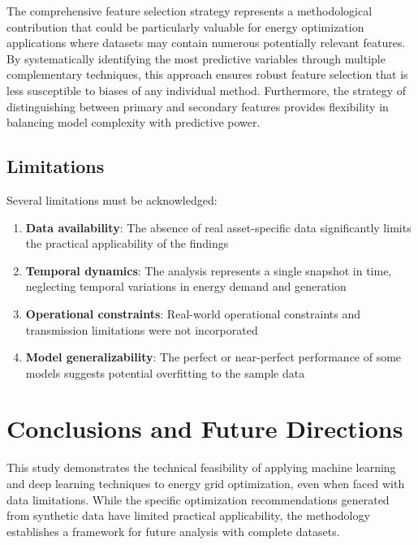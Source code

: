 \documentclass[12pt,a4paper]{article}
\begin{document}
The comprehensive feature selection strategy represents a methodological contribution that could be particularly valuable for energy optimization applications where datasets may contain numerous potentially relevant features. By systematically identifying the most predictive variables through multiple complementary techniques, this approach ensures robust feature selection that is less susceptible to biases of any individual method. Furthermore, the strategy of distinguishing between primary and secondary features provides flexibility in balancing model complexity with predictive power.

\subsection{Limitations}

Several limitations must be acknowledged:

\begin{enumerate}
    \item \textbf{Data availability}: The absence of real asset-specific data significantly limits the practical applicability of the findings
    \item \textbf{Temporal dynamics}: The analysis represents a single snapshot in time, neglecting temporal variations in energy demand and generation
    \item \textbf{Operational constraints}: Real-world operational constraints and transmission limitations were not incorporated
    \item \textbf{Model generalizability}: The perfect or near-perfect performance of some models suggests potential overfitting to the sample data
\end{enumerate}

\section{Conclusions and Future Directions}

This study demonstrates the technical feasibility of applying machine learning and deep learning techniques to energy grid optimization, even when faced with data limitations. While the specific optimization recommendations generated from synthetic data have limited practical applicability, the methodology establishes a framework for future analysis with complete datasets.
\end{document}
